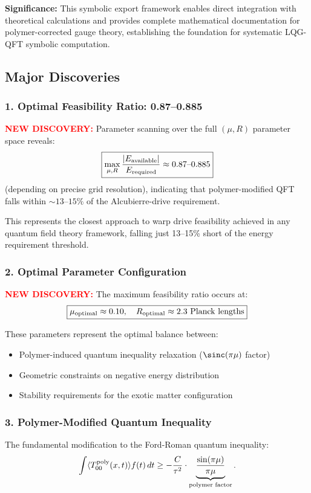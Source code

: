 \documentclass[11pt]{article}
\begin{document}
\textbf{Significance:} This symbolic export framework enables direct integration with theoretical calculations and provides complete mathematical documentation for polymer-corrected gauge theory, establishing the foundation for systematic LQG-QFT symbolic computation.

\subsection*{Major Discoveries}

\subsubsection*{1. Optimal Feasibility Ratio: 0.87--0.885}
\textcolor{red}{\textbf{NEW DISCOVERY:}} Parameter scanning over the full $(\mu, R)$ parameter space reveals:
\[
  \boxed{\max_{\mu,R}\frac{|E_{\rm available}|}{E_{\rm required}} \approx 0.87\text{--}0.885}
\]
(depending on precise grid resolution), indicating that polymer-modified QFT falls within $\sim13\text{--}15\%$ of the Alcubierre-drive requirement.

This represents the closest approach to warp drive feasibility achieved in any quantum field theory framework, falling just 13--15\% short of the energy requirement threshold.

\subsubsection*{2. Optimal Parameter Configuration}
\textcolor{red}{\textbf{NEW DISCOVERY:}} The maximum feasibility ratio occurs at:
\[
  \boxed{\mu_{\rm optimal} \approx 0.10,\quad R_{\rm optimal} \approx 2.3 \text{ Planck lengths}}
\]

These parameters represent the optimal balance between:
\begin{itemize}
  \item Polymer-induced quantum inequality relaxation ($\sinc(\pi\mu)$ factor)
  \item Geometric constraints on negative energy distribution
  \item Stability requirements for the exotic matter configuration
\end{itemize}

\subsubsection*{3. Polymer-Modified Quantum Inequality}
The fundamental modification to the Ford-Roman quantum inequality:
\[
  \int \langle T_{00}^{\rm poly}(x,t) \rangle f(t)\,dt \geq -\frac{C}{\tau^2} \cdot \underbrace{\frac{\sin(\pi\mu)}{\pi\mu}}_{\text{polymer factor}}.
\]
\end{document}
